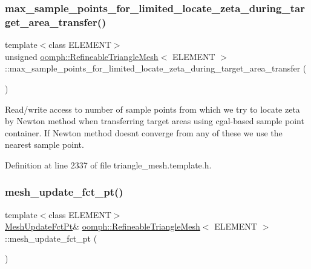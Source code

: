 \subsubsection{\texorpdfstring{max\+\_\+sample\+\_\+points\+\_\+for\+\_\+limited\+\_\+locate\+\_\+zeta\+\_\+during\+\_\+target\+\_\+area\+\_\+transfer()}{max\_sample\_points\_for\_limited\_locate\_zeta\_during\_target\_area\_transfer()}}
{\footnotesize\ttfamily template$<$class E\+L\+E\+M\+E\+NT$>$ \\
unsigned \hyperlink{classoomph_1_1RefineableTriangleMesh}{oomph\+::\+Refineable\+Triangle\+Mesh}$<$ E\+L\+E\+M\+E\+NT $>$\+::max\+\_\+sample\+\_\+points\+\_\+for\+\_\+limited\+\_\+locate\+\_\+zeta\+\_\+during\+\_\+target\+\_\+area\+\_\+transfer (\begin{DoxyParamCaption}{ }\end{DoxyParamCaption})\hspace{0.3cm}{\ttfamily [inline]}}



Read/write access to number of sample points from which we try to locate zeta by Newton method when transferring target areas using cgal-\/based sample point container. If Newton method doesn\textquotesingle{}t converge from any of these we use the nearest sample point. 



Definition at line 2337 of file triangle\+\_\+mesh.\+template.\+h.

\mbox{\label{classoomph_1_1RefineableTriangleMesh_a09e932b9b9b3a42616524dd3fcb35fd3}} 
\subsubsection{\texorpdfstring{mesh\+\_\+update\+\_\+fct\+\_\+pt()}{mesh\_update\_fct\_pt()}}
{\footnotesize\ttfamily template$<$class E\+L\+E\+M\+E\+NT$>$ \\
\hyperlink{classoomph_1_1RefineableTriangleMesh_aa78ffa56b66a1371aec25e25f7aaff9e}{Mesh\+Update\+Fct\+Pt}\& \hyperlink{classoomph_1_1RefineableTriangleMesh}{oomph\+::\+Refineable\+Triangle\+Mesh}$<$ E\+L\+E\+M\+E\+NT $>$\+::mesh\+\_\+update\+\_\+fct\+\_\+pt (\begin{DoxyParamCaption}{ }\end{DoxyParamCaption})\hspace{0.3cm}{\ttfamily [inline]}}



